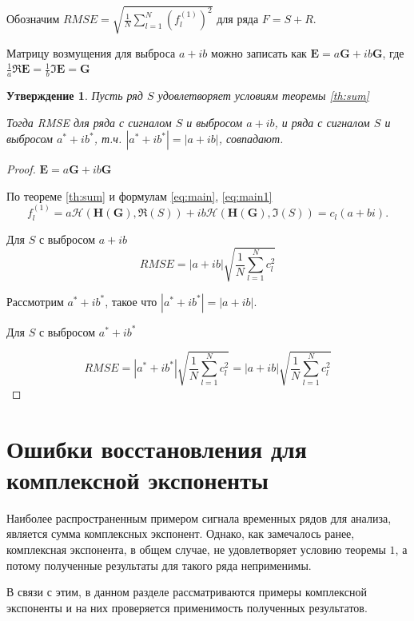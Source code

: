 \documentclass[specialist,
               substylefile = spbu.rtx,
               subf,href,colorlinks=true, 12pt]{disser}
\newtheorem{statement}{Утверждение}
\begin{document}
Обозначим $RMSE = \sqrt{\frac{1}{N}\sum_{l = 1}^{N} (f^{(1)}_l)^2}$ для ряда $F = S + R$.

Матрицу возмущения для выброса $a + ib$ можно записать как  $\mathbf{E} = a\mathbf{G} + ib\mathbf{G}$, где $\frac{1}{a}\Re\mathbf{E} = \frac{1}{b}\Im\mathbf{E}  = \mathbf{G}$
\begin{statement}\label{st:RMSEinv}
	Пусть ряд $S$ удовлетворяет условиям теоремы \ref{th:sum} 
	
	Тогда RMSE для ряда с сигналом $S$ и выбросом $a + ib$, и  ряда с сигналом $S$ и выбросом $a^* + ib^*$, т.ч. $|a^* + ib^*| = |a + ib|$, совпадают.
\end{statement}
\begin{proof}
	$\mathbf{E} = a\mathbf{G} + ib\mathbf{G}$
	
	По теореме \ref{th:sum} и формулам \eqref{eq:main}, \eqref{eq:main1}
	$$f^{(1)}_l = a\mathcal{H}(\mathbf{H}(\mathbf{G}), \Re(S)) + ib\mathcal{H}(\mathbf{H}(\mathbf{G}), \Im(S)) = c_l(a + bi).$$
	
	Для $S$ с выбросом $a + ib$
	$$RMSE = |a + ib|\sqrt{\frac{1}{N}\sum_{l = 1}^{N} c_l^2} $$
	 
	Рассмотрим $a^* + ib^*$, такое что $|a^* + ib^*| = |a + ib|$.
	
	Для $S$ с выбросом $a^* + ib^*$
	
	$$RMSE = |a^* + ib^*| \sqrt{\frac{1}{N}\sum_{l = 1}^{N} c_l^2} = |a + ib| \sqrt{\frac{1}{N}\sum_{l = 1}^{N} c_l^2}$$
\end{proof}

\chapter{Ошибки восстановления для комплексной экспоненты}

Наиболее распространенным примером сигнала временных рядов для анализа, является сумма комплексных экспонент. Однако, как замечалось ранее, комплексная экспонента, в общем случае, не удовлетворяет условию теоремы $1$, а потому полученные результаты для такого ряда неприменимы.

В связи с этим, в данном разделе рассматриваются примеры комплексной экспоненты и на них проверяется применимость полученных результатов.  
\end{document}
